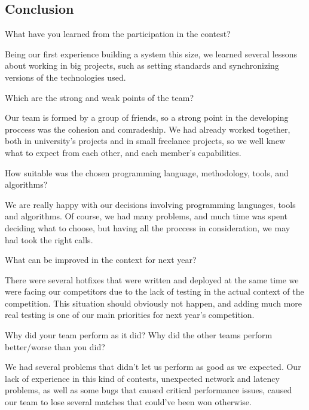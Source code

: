 \subsection{Conclusion}
\setcounter{question}{0}

\begin{question}
What have you learned from the participation in the contest?
\end{question}

Being our first experience building a system this size, we learned several
lessons about working in big projects, such as setting standards and
synchronizing versions of the technologies used.

\begin{question}
Which are the strong and weak points of the team?
\end{question}

Our team is formed by a group of friends, so a strong point in the developing
proccess was the cohesion and comradeship. We had already worked together, both
in university's projects and in small freelance projects, so we well knew what
to expect from each other, and each member's capabilities.

\begin{question}  
How suitable was the chosen programming language, methodology, tools, and
algorithms?
\end{question}

We are really happy with our decisions involving programming languages, tools
and algorithms. Of course, we had many problems, and much time was spent
deciding what to choose, but having all the proccess in consideration, we may
had took the right calls.

\begin{question}
What can be improved in the context for next year?
\end{question}

There were several hotfixes that were written and deployed at the same time we
were facing our competitors due to the lack of testing in the actual context of
the competition. This situation should obviously not happen, and adding much
more real testing is one of our main priorities for next year's competition.

\begin{question}
Why did your team perform as it did? Why did the other teams perform
better/worse than you did?
\end{question}

We had several problems that didn't let us perform as good as we expected.  Our
lack of experience in this kind of contests, unexpected network and latency
problems, as well as some bugs that caused critical performance issues, caused
our team to lose several matches that could've been won otherwise.

